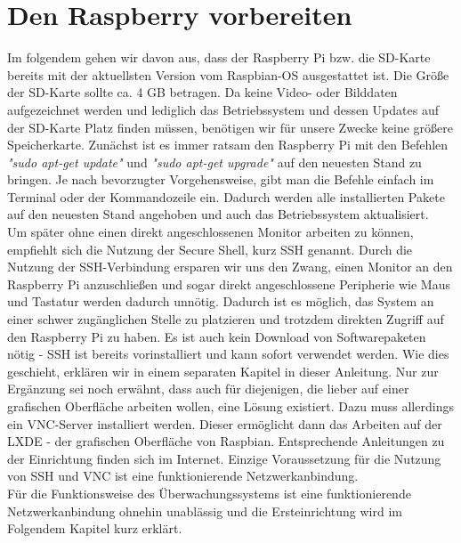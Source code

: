 \documentclass[12pt,a4paper]{scrreprt}
\begin{document}
\section{Den Raspberry vorbereiten}
Im folgendem gehen wir davon aus, dass der Raspberry Pi bzw. die SD-Karte bereits mit der aktuellsten Version vom Raspbian-OS ausgestattet ist. Die Größe der SD-Karte sollte ca. 4 GB betragen. Da keine Video- oder Bilddaten aufgezeichnet werden und lediglich das Betriebssystem und dessen Updates auf der SD-Karte Platz finden müssen, benötigen wir für unsere Zwecke keine größere Speicherkarte. Zunächst ist es immer ratsam den Raspberry Pi mit den Befehlen \textit{"sudo apt-get update"} und \textit{"sudo apt-get upgrade"} auf den neuesten Stand zu bringen. Je nach bevorzugter Vorgehensweise, gibt man die Befehle einfach im Terminal oder der Kommandozeile ein. Dadurch werden alle installierten Pakete auf den neuesten Stand angehoben und auch das Betriebssystem aktualisiert. \\Um später ohne einen direkt angeschlossenen Monitor arbeiten zu können, empfiehlt sich die Nutzung der Secure Shell, kurz SSH genannt. Durch die Nutzung der SSH-Verbindung ersparen wir uns den Zwang, einen Monitor an den Raspberry Pi anzuschließen und sogar direkt angeschlossene Peripherie wie Maus und Tastatur werden dadurch unnötig. Dadurch ist es möglich, das System an einer schwer zugänglichen Stelle zu platzieren und trotzdem direkten Zugriff auf den Raspberry Pi zu haben. Es ist auch kein Download von Softwarepaketen nötig - SSH ist bereits vorinstalliert und kann sofort verwendet werden. Wie dies geschieht, erklären wir in einem separaten Kapitel in dieser Anleitung. Nur zur Ergänzung sei noch erwähnt, dass auch für diejenigen, die lieber auf einer grafischen Oberfläche arbeiten wollen, eine Lösung existiert. Dazu muss allerdings ein VNC-Server installiert werden. Dieser ermöglicht dann das Arbeiten auf der LXDE - der grafischen Oberfläche von Raspbian. Entsprechende Anleitungen zu der Einrichtung finden sich im Internet. Einzige Voraussetzung für die Nutzung von SSH und VNC ist eine funktionierende Netzwerkanbindung. \\Für die Funktionsweise des Überwachungssystems ist eine funktionierende Netzwerkanbindung ohnehin unablässig und die Ersteinrichtung wird im Folgendem Kapitel kurz erklärt.
\end{document}
